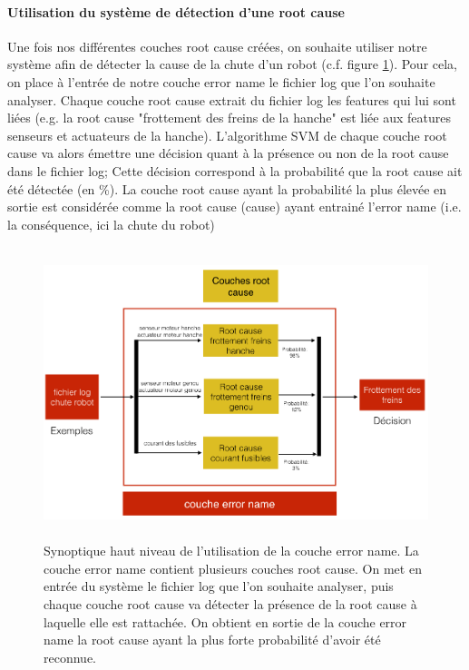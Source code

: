 \paragraph{Utilisation du système de détection d'une root cause}
Une fois nos différentes couches root cause créées, on souhaite utiliser notre système afin de détecter la cause de la chute d'un robot (c.f. figure \ref{fig:utilisation de la couche error name}). Pour cela, on place à l'entrée de notre couche error name le fichier log que l'on souhaite analyser. Chaque couche root cause extrait du fichier log les features qui lui sont liées (e.g. la root cause "frottement des freins de la hanche" est liée aux features senseurs et actuateurs de la hanche). L'algorithme SVM de chaque couche root cause va alors émettre une décision quant à la présence ou non de la root cause dans le fichier log; Cette décision correspond à la probabilité que la root cause ait été détectée (en \%). La couche root cause ayant la probabilité la plus élevée en sortie est considérée comme la root cause (cause) ayant entrainé l'error name (i.e. la conséquence, ici la chute du robot) 

\begin{figure}[h]
	\centering\includegraphics[height=8.5cm]{images/synoptique_error.png}
	\caption[Utilisation de la couche error name]{Synoptique haut niveau de l'utilisation de la couche error name. La couche error name contient plusieurs couches root cause. On met en entrée du système le fichier log que l'on souhaite analyser, puis chaque couche root cause va détecter la présence de la root cause à laquelle elle est rattachée. On obtient en sortie de la couche error name la root cause  ayant la plus forte probabilité d'avoir été reconnue.}
	\label{fig:utilisation de la couche error name}
\end{figure}

